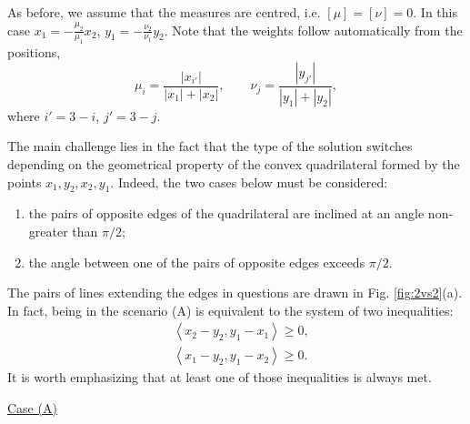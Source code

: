 \documentclass[11pt,letterpaper,reqno]{amsart}
\theoremstyle{definition}
\numberwithin{equation}{section}
\newcommand{\pairing}[1]{{\left \langle #1 \right \rangle}}
\newcommand{\abs}[1]{{\left \lvert #1 \right \rvert}}
\begin{document}
{As before, we assume that the measures are centred, i.e. $[\mu] = [\nu] =0$. In this case $x_1 = - \frac{\mu_2}{\mu_1} x_2$,  $y_1 = - \frac{\nu_2}{\nu_1} y_2$. Note that the weights follow automatically from the positions,
\begin{equation}
	\label{eq:weights}
	\mu_i =\frac{\abs{x_{i'}}}{\abs{x_1}+\abs{x_2}}, \qquad  \nu_j = \frac{|y_{j'}|}{ \abs{y_1}+\abs{y_2}},
\end{equation}
where $i' =3 -i$, $j'=3-j$.

The main challenge lies in the fact that the type of the solution switches depending on the geometrical property of the convex quadrilateral formed by the points $x_1,y_2,x_2,y_1$. Indeed, the two cases below must be considered:
\begin{enumerate}
	\item [(A)] the pairs of opposite edges of the quadrilateral are inclined at an angle non-greater than $\pi/2$;
	\item [(B)] the angle between one of the pairs of opposite edges exceeds $\pi/2$.
\end{enumerate}
The pairs of lines extending the edges in questions are drawn in Fig. \ref{fig:2vs2}(a). In fact, being in the scenario (A) is equivalent to the system of two inequalities: 
\begin{subequations}
	\label{eq:angles}
	\begin{align}
		\label{eq:angles1}
		&\pairing{x_2-y_2,y_1-x_1} \geq 0,\\
		\label{eq:angles2}
		&\pairing{x_1-y_2,y_1- x_2} \geq 0.
	\end{align}
\end{subequations}
It is worth emphasizing that at least one of those inequalities is always met.

 \noindent\underline{Case (A)}

}
\end{document}
